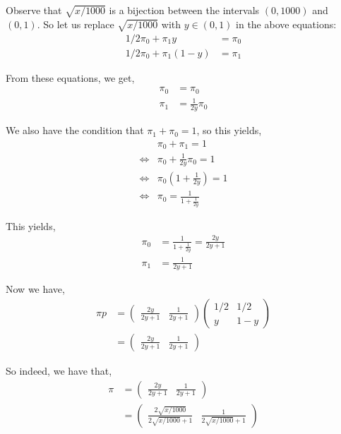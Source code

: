 \documentclass[12pt]{article}
\begin{document}
Observe that $\sqrt{x/1000}$ is a bijection between the intervals $(0, 1000)$ and $(0, 1)$. So let us replace $\sqrt{x/1000}$ with $y \in (0, 1)$ in the above equations:
\begin{align*}
1/2 \pi_0 + \pi_1 y &= \pi_0\\
1/2 \pi_0 + \pi_1 (1 - y) &= \pi_1
\end{align*}

From these equations, we get,
\begin{align*}
\pi_0 &= \pi_0\\
\pi_1 &= \frac{1}{2y} \pi_0
\end{align*}

We also have the condition that $\pi_1 + \pi_0 = 1$, so this yields,
\begin{align*}
&\pi_0 + \pi_1 = 1\\
\iff &\pi_0 + \frac{1}{2y} \pi_0 = 1\\
\iff &\pi_0 (1 + \frac{1}{2y}) = 1\\
\iff &\pi_0 = \frac{1}{1 + \frac{1}{2y}}
\end{align*}

This yields,
\begin{align*}
\pi_0 &= \frac{1}{1 + \frac{1}{2y}} = \frac{2y}{2y+1}\\
\pi_1 &= \frac{1}{2y+1}
\end{align*}

Now we have,
\begin{align*}
\pi p &= \begin{pmatrix}
\frac{2y}{2y+1} & \frac{1}{2y+1}
\end{pmatrix} \begin{pmatrix}
    1/2 & 1/2\\
    y & 1 - y
\end{pmatrix}\\
&= \begin{pmatrix}
\frac{2y}{2y+1} & \frac{1}{2y+1}
\end{pmatrix}
\end{align*}

So indeed, we have that,
\begin{align*}
\pi &= \begin{pmatrix}
\frac{2y}{2y+1} & \frac{1}{2y+1}
\end{pmatrix}\\
&= \begin{pmatrix}
\frac{2\sqrt{x/1000}}{2\sqrt{x/1000}+1} & \frac{1}{2\sqrt{x/1000}+1}
\end{pmatrix}
\end{align*}
\end{document}
